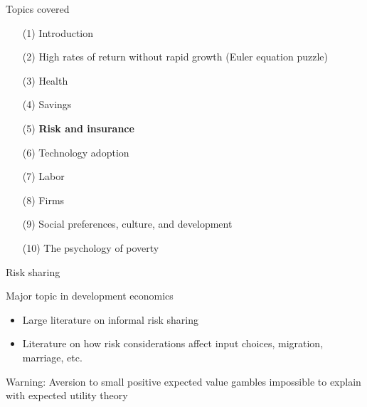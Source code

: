 \documentclass[aspectratio=169, 10pt, handout]{beamer}
\newenvironment{wideitemize}{\itemize\addtolength{\itemsep}{10pt}}{\enditemize}
\begin{document}
\begin{frame}{Topics covered}

\small 

\begin{enumerate}[(1)]

	\item[(1)] Introduction 
	
	\item[(2)] {High rates of return without rapid growth (Euler equation puzzle)}

	\item[(3)] {Health}
	
	\item[(4)] {Savings}
		
	\item[(5)] \textbf{Risk and insurance}

	\item[(6)] Technology adoption
	
	\item[(7)] Labor

	\item[(8)] Firms
	
	\item[(9)] Social preferences, culture, and development
	
	\item[(10)] The psychology of poverty

\end{enumerate}

\end{frame}



\begin{frame}{Risk sharing}

\begin{wideitemize}

	\item Major topic in development economics

	\begin{itemize}

		\item Large literature on informal risk sharing 

		\item Literature on how risk considerations affect input choices, migration, marriage, etc.

	\end{itemize}

	\item Warning: Aversion to small positive expected value gambles impossible to explain with expected utility theory \citep{rabin2000diminishing}


\end{wideitemize}

\end{frame}
\end{document}
